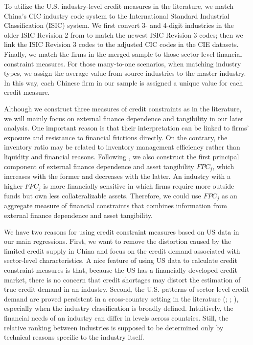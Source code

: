 \documentclass[12pt]{article}
\begin{document}
To utilize the U.S. industry-level credit measures in the literature, we match China's CIC industry code system to the International Standard Industrial Classification (ISIC) system. We first convert 3- and 4-digit industries in the older ISIC Revision 2 from \cite{manova-wei-zhang2015} to match the newest ISIC Revision 3 codes; then we link the ISIC Revision 3 codes to the adjusted CIC codes in the CIE datasets. Finally, we match the firms in the merged sample to those sector-level financial constraint measures. For those many-to-one scenarios, when matching industry types, we assign the average value from source industries to the master industry. In this way, each Chinese firm in our sample is assigned a unique value for each credit measure.

Although we construct three measures of credit constraints as in the literature, we will mainly focus on external finance dependence and tangibility in our later analysis. One important reason is that their interpretation can be linked to firms' exposure and resistance to financial frictions directly. On the contrary, the inventory ratio may be related to inventory management efficiency rather than liquidity and financial reasons. Following \cite{manova-wei-zhang2015}, we also construct the first principal component of external finance dependence and asset tangibility $FPC_j$, which increases with the former and decreases with the latter. An industry with a higher $FPC_j$ is more financially sensitive in which firms require more outside funds but own less collateralizable assets. Therefore, we could use $FPC_j$ as an aggregate measure of financial constraints that combines information from external finance dependence and asset tangibility.

We have two reasons for using credit constraint measures based on US data in our main regressions. First, we want to remove the distortion caused by the limited credit supply in China and focus on the credit demand associated with sector-level characteristics. A nice feature of using US data to calculate credit constraint measures is that, because the US has a financially developed credit market, there is no concern that credit shortages may distort the estimation of true credit demand in an industry. Second, the U.S. patterns of sector-level credit demand are proved persistent in a cross-country setting in the literature (\cite{kroszner2007}; \cite{manova-wei-zhang2015}; \cite{fan-lai-li2015}), especially when the industry classification is broadly defined. Intuitively, the financial needs of an industry can differ in levels across countries. Still, the relative ranking between industries is supposed to be determined only by technical reasons specific to the industry itself.
\end{document}
